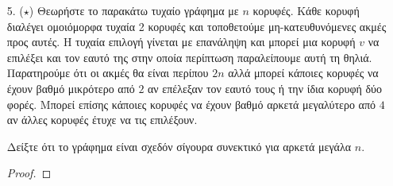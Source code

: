 \documentclass[a4paper, oneside, 11pt]{article}
\theoremstyle{definition}
\begin{document}
\begin{enumerate}
Λήμμα 1: Το $\frac{n!}{x!y!(n-x-y)!}$ μεγιστοποιείται για $x=y=\frac{n}{3}$.
\begin{proof}
Έστω ότι το ζητούμενο δεν ισχύει και $A$ η μέγιστη τιμή της παράστασης και χωρίς βλάβη της γενικότητας $x<\frac{n}{3}$ και $y>\frac{n}{3}$. Θεωρούμε $x'=x+1$ και $y'=y-1$. Τότε η νέα τιμή της παράστασης
είναι $A'=\frac{n!}{(x+1)!(y-1)!(n-x-y)!} = A \cdot \frac{y}{x+1}\geq A$. Αυτό είναι άτοπο, άρα το ζητούμενο ισχύει.
\end{proof}

Λήμμα 2: Το ${x \choose 2} + {y\choose 2} + {n-x-y \choose 2}$ ελαχιστοποιείται για $x=y=\frac{n}{3}$.
\begin{proof}
Η παραπάνω παράσταση είναι ίση με $\frac{1}{2} (x^2 + y^2 + (n-x-y)^2 - (x+y+n-x-y)) \geq_{cauchy-schwarz} \frac{1}{2}(\frac{1}{3} n^2 - n)$. Η ισότητα πραγματοποιείται όταν $x=y=n-x-y$, δηλαδή $x=y=\frac{n}{3}$.
\end{proof}

\item[5. ($\star$)]
   Θεωρήστε το παρακάτω τυχαίο γράφημα με $n$ κορυφές. Κάθε κορυφή διαλέγει
   ομοιόμορφα τυχαία 2 κορυφές και τοποθετούμε μη-κατευθυνόμενες ακμές προς
   αυτές. Η τυχαία επιλογή γίνεται με επανάληψη και μπορεί μια κορυφή $v$ να
   επιλέξει και τον εαυτό της στην οποία περίπτωση παραλείπουμε αυτή τη θηλιά.
   Παρατηρούμε ότι οι ακμές θα είναι περίπου $2n$ αλλά μπορεί κάποιες κορυφές να
   έχουν βαθμό μικρότερο από $2$ αν επέλεξαν τον εαυτό τους ή την ίδια κορυφή
   δύο φορές. Μπορεί επίσης κάποιες κορυφές να έχουν βαθμό αρκετά μεγαλύτερο από
   $4$ αν άλλες κορυφές έτυχε να τις επιλέξουν.

   Δείξτε ότι το γράφημα είναι σχεδόν σίγουρα συνεκτικό για αρκετά μεγάλα $n$.

   \begin{proof}
   \end{proof}

\end{enumerate}
\end{document}
